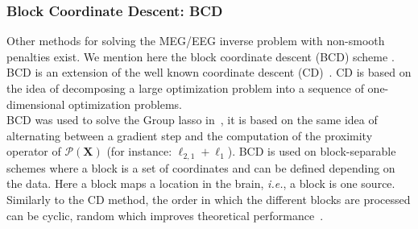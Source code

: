 

\subsubsection*{Block Coordinate Descent: BCD} \label{section:BCD}
Other methods for solving the MEG/EEG inverse problem with non-smooth penalties exist. We mention here the block coordinate descent (BCD) scheme \cite{tseng2010approximation}. BCD is an extension of the well known coordinate descent (CD)~\cite{li-osher:2009,nesterov2012efficiency}. CD is based on the idea of decomposing a large optimization problem into a sequence of one-dimensional optimization problems. \\

BCD was used to solve the Group \ac{lasso} in~\cite{rakotomamonjy2011surveying,qin2013efficient}, it is based on the same idea of alternating between a gradient step and the computation of the proximity operator of $\mathcal{P}(\mathbf{X})$ (for instance: $\ell_{2,1}+\ell_1$). BCD is used on block-separable schemes where a block is a set of coordinates and can be defined depending on the data. Here a block maps a location in the brain, \textit{i.e.}, a block is one source. Similarly to the CD method, the order in which the different blocks are processed can be cyclic, random which improves theoretical performance~\cite{tseng2001convergence,wei2012doa}. \\

